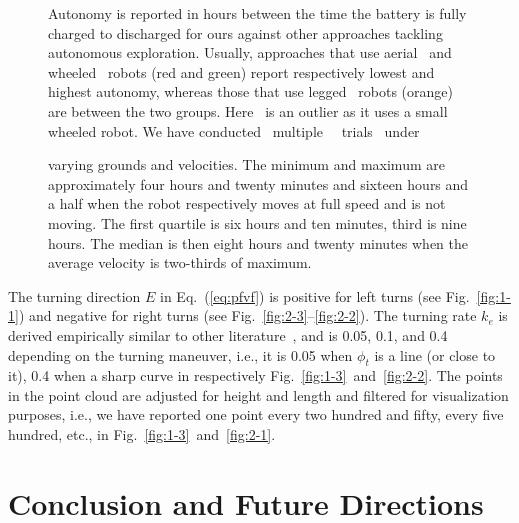 \documentclass[lettersize,journal]{IEEEtran}
\theoremstyle{definition}
\begin{document}
\begin{figure}[!t]
  \vspace*{-.3cm}
  \begin{minipage}[t]{0.55\columnwidth}
    \hspace*{-.4cm}
    
  \end{minipage}\hfill
  \begin{minipage}[t]{0.44\columnwidth}
    \vspace*{-5.1cm}
    \centering
    \caption{Autonomy is reported in hours between the time the battery is fully charged to discharged for ours against other approaches tackling autonomous exploration. 
    Usually, approaches that use aerial~\cite{schmid2020efficient,kulkarni2022autonomous} and wheeled~\cite{muller2021openbot,roucek2020darpa,surmann2003autonomous} robots (red and green) report respectively lowest and highest autonomy, whereas those that use legged~\cite{kulkarni2022autonomous,tranzatto2022cerberus} robots (orange) are between the two groups. Here~\cite{muller2021openbot} is an outlier as it uses a small wheeled robot. We have conducted ~multiple ~~trials ~under}
    \label{fig}
  \end{minipage}
  \vspace*{-.68cm}
  \caption*{varying grounds and velocities. The minimum and maximum are approximately four hours and twenty minutes and sixteen hours and a half when the robot respectively moves at full speed and is not moving. The first quartile is six hours and ten minutes, third is nine hours. The median is then eight hours and twenty minutes when the average velocity is two-thirds of maximum.}
  \vspace*{-.5cm}
\end{figure}

The turning direction $E$ in Eq.~(\ref{eq:pfvf}) is positive for left turns (see Fig.~\ref{fig:1-1}) and negative for right turns (see Fig.~\ref{fig:2-3}--\ref{fig:2-2}). The turning rate $k_e$ is derived empirically similar to other literature~\cite{seewald2022energy,garcia2017guidance}, and is 0.05, 0.1, and 0.4 depending on the turning maneuver, i.e., it is 0.05 when $\phi_t$ is a line (or close to it), 0.4 when a sharp curve in respectively Fig.~\ref{fig:1-3}~and~\ref{fig:2-2}. The points in the point cloud are adjusted for height and length and filtered for visualization purposes, i.e., we have reported one point every two hundred and fifty, every five hundred, etc., in Fig.~\ref{fig:1-3}~and~\ref{fig:2-1}.

\section{Conclusion and Future Directions}
\label{sec:cf}
\end{document}
